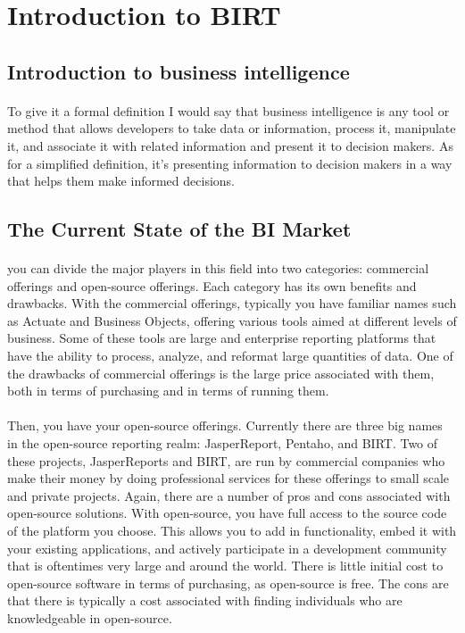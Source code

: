 \section{Introduction to BIRT}
\subsection{Introduction to business intelligence}

\paragraph{}
To give it a formal definition I would say that business intelligence is any tool or method 
that allows developers to take data or information, process it, manipulate it, and associate 
it with related information and present it to decision makers. As for a simplified definition, 
it's presenting information to decision makers in a way that helps them make informed decisions.

\subsection{The Current State of the BI Market}
\paragraph{}
you can divide the major players in this field into two categories: commercial offerings 
and open-source offerings. Each category has its own benefits and drawbacks. With the 
commercial offerings, typically you have familiar names such as Actuate and Business Objects,
offering various tools aimed at different levels of business. Some of these tools
are large and enterprise reporting platforms that have the ability to process,
analyze, and reformat large quantities of data. One of the drawbacks of commercial offerings is 
the large price associated with them, both in terms of purchasing and in terms of running them. 

\paragraph{}
Then, you have your open-source offerings. Currently there are three big names in
the open-source reporting realm: JasperReport, Pentaho, and BIRT. Two of these
projects, JasperReports and BIRT, are run by commercial companies who make their
money by doing professional services for these offerings to small scale and private
projects. Again, there are a number of pros and cons associated with open-source
solutions. With open-source, you have full access to the source code of the platform
you choose. This allows you to add in functionality, embed it with your existing
applications, and actively participate in a development community that is oftentimes
very large and around the world. There is little initial cost to open-source software in
terms of purchasing, as open-source is free. The cons are that there is typically a cost
associated with finding individuals who are knowledgeable in open-source.

